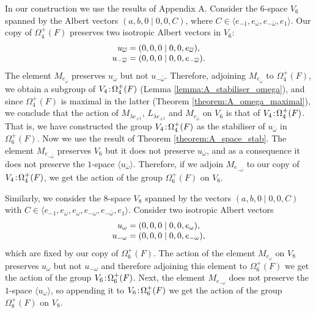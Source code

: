 In our construction we use the results of Appendix A. Consider the \mbox{$6$-space} $V_6$ spanned by the Albert vectors
$(a,b,0\mid 0,0,C)$, where $C \in \langle e_{-1}, e_{\bar{\omega}}, e_{-\bar{\omega}}, 
e_1 \rangle$. Our copy of $\Omega_4^+(F)$ preserves two isotropic Albert vectors in
 $V_6$:
\begin{equation}
	\begin{array}{r@{\;}c@{\;}l}
		u_{\bar{\omega}} & = & (0,0,0\mid 0,0,e_{\bar{\omega}}), \\
		u_{-\bar{\omega}} & = & (0,0,0\mid 0,0,e_{-\bar{\omega}}). \\
	\end{array} 
\end{equation}
The element $M_{e_{\bar{\omega}}}$ preserves $u_{\bar{\omega}}$ but not $u_{-\bar{\omega}}$.
Therefore, adjoining $M_{e_{\bar{\omega}}}$ to $\Omega_4^+(F)$, 
we obtain a subgroup
of $V_4\mathord{{\;\!{:}\;\!}}\Omega_4^+(F)$ (Lemma \ref{lemma:A_stabiliser_omega}), and since 
$\Omega_4^+(F)$
is maximal in the latter (Theorem \ref{theorem:A_omega_maximal}), we conclude that the action of $M_{\lambda e_{\pm 1}}$, 
$L_{\lambda e_{\pm 1}}$ and $M_{e_{\bar{\omega}}}$ on $V_6$ is that of 
$V_4\mathord{{\;\!{:}\;\!}}\Omega_4^+(F)$. That is, we have constructed the group 
$V_4\mathord{{\;\!{:}\;\!}}\Omega_4^+(F)$
as the stabiliser of $u_{\bar{\omega}}$ in $\Omega_6^+(F)$. 
Now we use the result of Theorem \ref{theorem:A_space_stab}. The element
 $M_{e_{-\bar{\omega}}}$ preserves $V_6$ but it does not preserve
$u_{\bar{\omega}}$, and as a consequence it does not preserve the $1$-space $\langle
u_{\bar{\omega}} \rangle$. Therefore, if we adjoin $M_{e_{-\bar{\omega}}}$ to our copy of 
$V_4\mathord{{\;\!{:}\;\!}}\Omega_4^+(F)$, we get the action of the group $\Omega_6^+(F)$ on $V_6$. 

Similarly, we consider the $8$-space $V_8$ spanned by the vectors 
$(a,b,0\mid 0,0,C)$ with $C \in \langle e_{-1}, e_{\bar{\omega}}, e_{\omega}, 
e_{- \omega}, e_{-\bar{\omega}}, e_1 \rangle$. Consider two isotropic Albert vectors
\begin{equation}
	\begin{array}{r@{\;}c@{\;}l}
		u_{\omega} & = & (0,0,0 \mid 0,0,e_{\omega}), \\
		u_{-\omega} & = & (0,0,0 \mid 0,0,e_{-\omega}),
	\end{array}
\end{equation}
which are fixed by our copy of $\Omega_6^+(F)$. The action of the element
 $M_{e_{\omega}}$
on $V_8$ preserves $u_{\omega}$ but not $u_{-\omega}$ and therefore adjoining this element
to $\Omega_6^+(F)$ we get the action of the group $V_6\mathord{{\;\!{:}\;\!}}\Omega_6^+(F)$. Next, 
the element $M_{e_{-\omega}}$ does not preserve the $1$-space $\langle u_{\omega} \rangle$,
so appending it to $V_6\mathord{{\;\!{:}\;\!}}\Omega_6^+(F)$ we get the action of the group
$\Omega_8^+(F)$ on $V_8$. 

